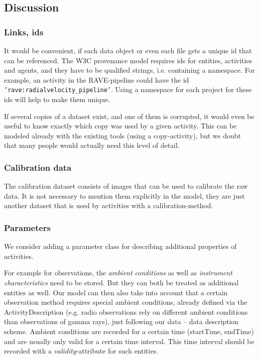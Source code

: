 




\subsection{Discussion}


\subsubsection{Links, ids}\label{sec:links_between_data}
It would be convenient, if each data object or even each file 
gets a unique id that can be referenced. The W3C provenance model requires ids
for entities, activities and agents, and they have to be qualified strings, 
i.e. containing a namespace. For example, an activity in the RAVE-pipeline could 
have the id \texttt{'rave:radialvelocity\_pipeline'}. Using a namespace for each 
project for these ids will help to make them unique. 

If several copies of a dataset exist, and one of them is corrupted, it would even be useful to know
exactly which copy was used by a given activity. This can be modeled already 
with the existing tools (using a copy-activity), but we doubt that many people
would actually need this level of detail.



\subsubsection{Calibration data}
The calibration dataset consists of images that can be used to calibrate the
raw data. It is not necessary to mention them explicitly in the model, 
they are just another dataset that is used by activities with a 
calibration-method.


\subsubsection{Parameters}
We consider adding a parameter class for describing additional properties of activities.

For example for observations, the \emph{ambient conditions} as well as 
\emph{instrument characteristics} need to be stored. But they can both be treated
as additional entities as well. 
Our model can then also take into account that a certain observation
method requires special ambient conditions, already defined via the 
ActivityDescription (e.g. radio observations rely on different ambient 
conditions than observations
of gamma rays), just following our data -- data description scheme.
Ambient conditions are recorded for a certain time (startTime, endTime) and are
usually only valid for a certain time interval. This time interval should be recorded
with a \emph{validity}-attribute for such entities.

